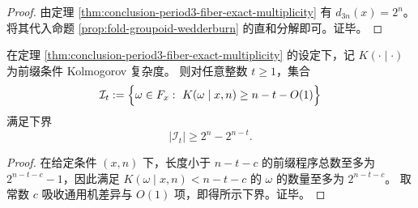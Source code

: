 \begin{proof}
由定理 \ref{thm:conclusion-period3-fiber-exact-multiplicity} 有 \(d_{3n}(x)=2^n\)。
将其代入命题 \ref{prop:fold-groupoid-wedderburn} 的直和分解即可。证毕。
\end{proof}

\begin{proposition}[单一周期纤维内的不可压缩微态计数]\label{prop:conclusion-single-fiber-kolmogorov-incompressible}
在定理 \ref{thm:conclusion-period3-fiber-exact-multiplicity} 的设定下，记 \(K(\cdot\mid\cdot)\) 为前缀条件 Kolmogorov 复杂度。
则对任意整数 \(t\ge 1\)，集合
\[
\mathcal I_t
:=\Bigl\{\omega\in F_x:\ K(\omega\mid x,n)\ge n-t-O(1)\Bigr\}
\]
满足下界
\[
|\mathcal I_t|\ge 2^n-2^{n-t}.
\]
\end{proposition}

\begin{proof}
在给定条件 \((x,n)\) 下，长度小于 \(n-t-c\) 的前缀程序总数至多为 \(2^{n-t-c}-1\)，因此满足
\(
K(\omega\mid x,n)<n-t-c
\)
的 \(\omega\) 的数量至多为 \(2^{n-t-c}\)。
取常数 \(c\) 吸收通用机差异与 \(O(1)\) 项，即得所示下界。证毕。
\end{proof}

\endinput

